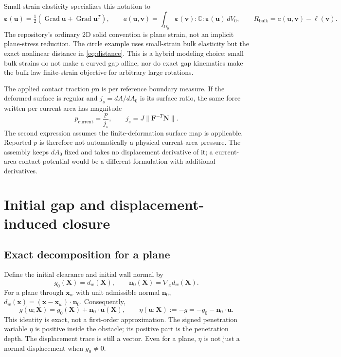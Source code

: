 \documentclass[preprint,11pt]{elsarticle}
\numberwithin{equation}{section}
\newcommand{\bu}{\boldsymbol{u}}
\newcommand{\bv}{\boldsymbol{v}}
\newcommand{\bx}{\boldsymbol{x}}
\newcommand{\bX}{\boldsymbol{X}}
\newcommand{\bn}{\boldsymbol{n}}
\newcommand{\bN}{\boldsymbol{N}}
\newcommand{\bF}{\boldsymbol{F}}
\newcommand{\bC}{\mathbb{C}}
\newcommand{\Grad}{\operatorname{Grad}}
\newcommand{\eps}{\boldsymbol{\varepsilon}}
\newcommand{\Rbulk}{R_{\mathrm{bulk}}}
\begin{document}
Small-strain elasticity specializes this notation to
\begin{equation}
 \eps(\bu)=\tfrac12(\Grad\bu+\Grad\bu^T),\qquad
 a(\bu,\bv)=\int_{\Omega_0}\eps(\bv):\bC:\eps(\bu)\,dV_0,
 \qquad \Rbulk=a(\bu,\bv)-\ell(\bv).
 \label{eq:smallstrain}
\end{equation}
The repository's ordinary 2D solid convention is plane strain, not an
implicit plane-stress reduction. The circle example uses small-strain
bulk elasticity but the exact nonlinear distance in \eqref{eq:distance}.
This is a hybrid modeling choice: small bulk strains do not make a curved
gap affine, nor do exact gap kinematics make the bulk law finite-strain
objective for arbitrary large rotations.

The applied contact traction $p\bn$ is per reference boundary measure.
If the deformed surface is regular and $j_s=dA/dA_0$ is its surface ratio,
the same force written per current area has magnitude
\begin{equation}
 p_{\mathrm{current}}=\frac{p}{j_s},\qquad
 j_s=J\|\bF^{-T}\bN\|.
 \label{eq:surfacepressure}
\end{equation}
The second expression assumes the finite-deformation surface map is
applicable. Reported $p$ is therefore not automatically a physical
current-area pressure. The assembly keeps $dA_0$ fixed and takes no
displacement derivative of it; a current-area contact potential would be
a different formulation with additional derivatives.

\section{Initial gap and displacement-induced closure}
\label{sec:gap}

\subsection{Exact decomposition for a plane}
Define the initial clearance and initial wall normal by
\begin{equation}
 g_0(\bX)=d_w(\bX),\qquad \bn_0(\bX)=\nabla_x d_w(\bX).
 \label{eq:initialgap}
\end{equation}
For a plane through $\bx_w$ with unit admissible normal $\bn_0$,
$d_w(\bx)=(\bx-\bx_w)\cdot\bn_0$. Consequently,
\begin{equation}
 \boxed{g(\bu;\bX)=g_0(\bX)+\bn_0\cdot\bu(\bX)},\qquad
 \eta(\bu;\bX):=-g=-g_0-\bn_0\cdot\bu.
 \label{eq:planegap}
\end{equation}
This identity is exact, not a first-order approximation. The signed
penetration variable $\eta$ is positive inside the obstacle; its positive
part is the penetration depth. The displacement trace is still a vector.
Even for a plane, $\eta$ is not just a normal displacement when $g_0\ne0$.
\end{document}
